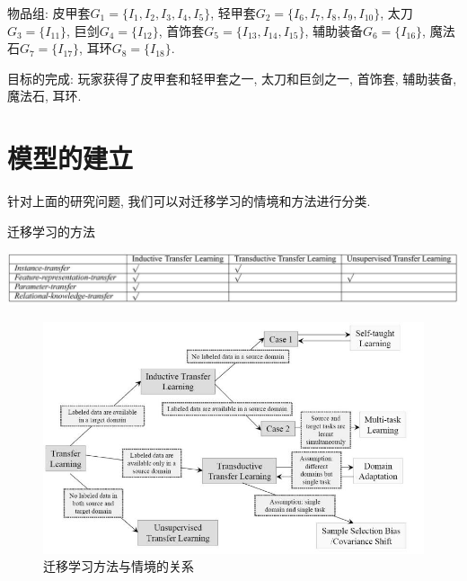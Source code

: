 \documentclass[10pt,journal,compsoc]{IEEEtran}
\begin{document}
  物品组: 皮甲套$G_1=\{I_1, I_2, I_3, I_4, I_5\}$, 轻甲套$G_2=\{I_6, I_7, I_8, I_9, I_{10}\}$, 太刀$G_3=\{I_{11}\}$, 巨剑$G_4=\{I_{12}\}$, 首饰套$G_5=\{I_{13}, I_{14}, I_{15}\}$, 辅助装备$G_6=\{I_{16}\}$, 魔法石$G_7=\{I_{17}\}$, 耳环$G_8=\{I_{18}\}$.
  
  
  
  目标的完成: 玩家获得了皮甲套和轻甲套之一, 太刀和巨剑之一, 首饰套, 辅助装备, 魔法石, 耳环. 



\section{模型的建立}

针对上面的研究问题, 我们可以对迁移学习的情境和方法进行分类. 

\begin{table}[!ht]
\centering
\caption{迁移学习的方法}
\label{tab:survey_method}
\includegraphics[width=40pc]{img/survey_tab3.jpg}
\end{table}

\begin{figure}[!ht]
\centering
\includegraphics[width=30pc]{img/survey_fig1.jpg}
\caption{迁移学习方法与情境的关系}
\label{fig:survey_method}
\end{figure}
\end{document}
